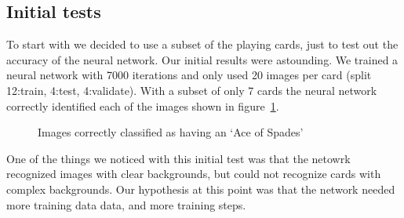 \documentclass[letterpaper]{article}
\begin{document}
\subsection{Initial tests}
To start with we decided to use a subset of the playing cards, just to test out the accuracy of the neural network.  Our initial results were astounding.  We trained a neural network with 7000 iterations and only used 20 images per card (split 12:train, 4:test, 4:validate).  With a subset of only 7 cards the neural network correctly identified each of the images shown in figure~\ref{fig:initial_results_1}. 
\begin{figure}[!tbp]
  \centering

  \caption{\label{fig:initial_results_1} Images correctly classified as having an `Ace of Spades'}
\end{figure}


One of the things we noticed with this initial test was that the netowrk recognized images with clear backgrounds, but could not recognize cards with complex backgrounds.  Our hypothesis at this point was that the network needed more training data data, and more training steps.
\end{document}
